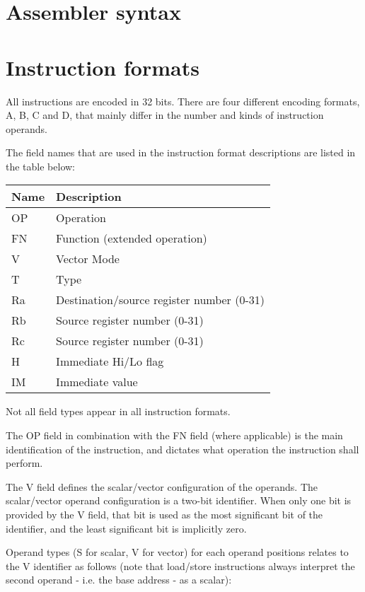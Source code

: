 
\section{Assembler syntax}

\tbd

\section{Instruction formats}

All instructions are encoded in 32 bits. There are four different encoding
formats, A, B, C and D, that mainly differ in the number and kinds of
instruction operands.

The field names that are used in the instruction format descriptions are listed
in the table below:

\begin{tabular}{|l|l|}
  \hline
  \textbf{Name} & \textbf{Description} \\
  \hline
  OP & Operation \\
  \hline
  FN & Function (extended operation) \\
  \hline
  V  & Vector Mode \\
  \hline
  T  & Type \\
  \hline
  Ra & Destination/source register number (0-31) \\
  \hline
  Rb & Source register number (0-31) \\
  \hline
  Rc & Source register number (0-31) \\
  \hline
  H  & Immediate Hi/Lo flag \\
  \hline
  IM & Immediate value \\
  \hline
\end{tabular}

Not all field types appear in all instruction formats.

The OP field in combination with the FN field (where applicable) is the main
identification of the instruction, and dictates what operation the instruction
shall perform.

The V field defines the scalar/vector configuration of the operands. The
scalar/vector operand configuration is a two-bit identifier. When only one bit
is provided by the V field, that bit is used as the most significant bit of the
identifier, and the least significant bit is implicitly zero.

Operand types (S for scalar, V for vector) for each operand positions relates
to the V identifier as follows (note that load/store instructions always
interpret the second operand - i.e. the base address - as a scalar):


